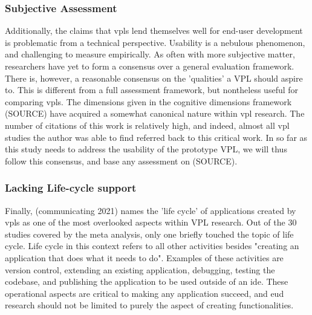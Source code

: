 \subsubsection*{Subjective Assessment}
Additionally, the claims that \ac{vpl}s lend themselves well for end-user development is problematic from a technical perspective. 
Usability is a nebulous phenomenon, and challenging to measure empirically.
As often with more subjective matter, researchers have yet to form a consensus over a general evaluation framework. 
There is, however, a reasonable consensus on the 'qualities' a VPL should aspire to. 
This is different from a full assessment framework, but nontheless useful for comparing \ac{vpl}s.
The dimensions given in the cognitive dimensions framework (SOURCE) have acquired a somewhat canonical nature within \ac{vpl} research.
The number of citations of this work is relatively high, and indeed, almost all \ac{vpl} studies the author was able to find referred back to this critical work.   
In so far as this study needs to address the usability of the prototype VPL, we will thus follow this consensus, and base any assessment on (SOURCE).


\subsubsection*{Lacking Life-cycle support}
Finally, (communicating 2021) names the 'life cycle' of applications created by \ac{vpl}s as one of the most overlooked aspects within VPL research.
Out of the 30 studies covered by the meta analysis, only one briefly touched the topic of life cycle. 
Life cycle in this context refers to all other activities besides "creating an application that does what it needs to do".
Examples of these activities are version control, extending an existing application, debugging, testing the codebase, and publishing the application to be used outside of an \ac{ide}. 
These operational aspects are critical to making any application succeed, and \ac{eud} research should not be limited to purely the aspect of creating functionalities.

